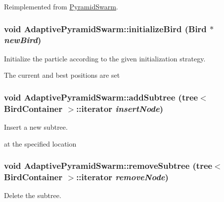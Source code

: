 Reimplemented from \hyperlink{classPyramidSwarm_a9a21f0581b43dc3549fee12d6f2229e}{PyramidSwarm}.\hypertarget{classAdaptivePyramidSwarm_4589069dda7b2f37f71792ac72cd2fa0}{
\subsubsection{\setlength{\rightskip}{0pt plus 5cm}void AdaptivePyramidSwarm::initializeBird ({\bf Bird} $\ast$ {\em newBird})}}
\label{classAdaptivePyramidSwarm_4589069dda7b2f37f71792ac72cd2fa0}


Initialize the particle according to the given initialization strategy. 

The current and best positions are set \hypertarget{classAdaptivePyramidSwarm_45c5cc5ee2e6608d899f1b79b8ad170a}{
\subsubsection{\setlength{\rightskip}{0pt plus 5cm}void AdaptivePyramidSwarm::addSubtree ({\bf tree}$<$ {\bf BirdContainer} $>$::iterator {\em insertNode})}}
\label{classAdaptivePyramidSwarm_45c5cc5ee2e6608d899f1b79b8ad170a}


Insert a new subtree. 

at the specified location \hypertarget{classAdaptivePyramidSwarm_bc68c769114ea5cca2acf90938232418}{
\subsubsection{\setlength{\rightskip}{0pt plus 5cm}void AdaptivePyramidSwarm::removeSubtree ({\bf tree}$<$ {\bf BirdContainer} $>$::iterator {\em removeNode})}}
\label{classAdaptivePyramidSwarm_bc68c769114ea5cca2acf90938232418}


Delete the subtree. 

